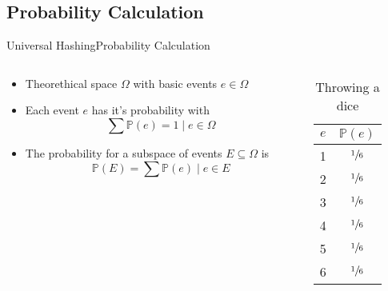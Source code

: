 \subsection{Probability Calculation}

\begin{frame}{Universal Hashing}{Probability Calculation}
  \begin{columns}
    \begin{column}{0.65\textwidth}
      \begin{itemize}
        \item
          Theorethical space $\Omega$ with basic events $e \in \Omega$
        \item
          Each event $e$ has it's probability with
          \[\sum \mathbb{P}(e) = 1 \mid e \in \Omega\]
        \item
          The probability for a subspace of events $E \subseteq \Omega$ is
          \[\mathbb{P}(E) = \sum \mathbb{P}(e) \mid e \in E\]
      \end{itemize}
    \end{column}
    \begin{column}{0.35\textwidth}
      \begin{table}[!h]
        \caption{Throwing a dice}
        \label{tab:probabilities:rolling_dice}
        \begin{tabularx}{0.5\linewidth}{c|c}
          $e$ & $\mathbb{P}(e)$\\
          \midrule
          1 & $\sfrac{1}{6}$\\
          2 & $\sfrac{1}{6}$\\
          3 & $\sfrac{1}{6}$\\
          4 & $\sfrac{1}{6}$\\
          5 & $\sfrac{1}{6}$\\
          6 & $\sfrac{1}{6}$\\
        \end{tabularx}
      \end{table}
    \end{column}
  \end{columns}
\end{frame}


